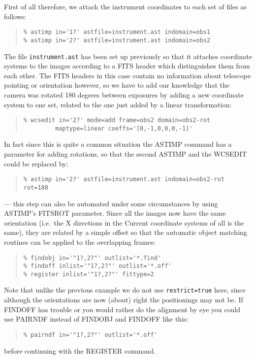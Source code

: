\documentclass[twoside,11pt]{article}
\newcommand{\htmlref}[2]{#1}
\newcommand{\latexhtml}[2]{#1}
\renewcommand{\_}{\texttt{\symbol{95}}}
\newcommand{\ttsize}{\latexhtml{\small}{}}
\newenvironment{myquote}{\begin{quote}\ttsize}{\end{quote}}
\newcommand{\text}[1]{{\ttsize \tt #1}}
\newcommand{\routine}[1]{{\sc #1}}
\newcommand{\xroutine}[1]{\htmlref{{\sc #1}}{#1}}
\begin{document}
First of all therefore, we attach the instrument coordinates
to each set of files as follows:
\begin{myquote}
\begin{verbatim}
% astimp in='1?' astfile=instrument.ast indomain=obs1 
% astimp in='2?' astfile=instrument.ast indomain=obs2
\end{verbatim}
\end{myquote}
The file \text{instrument.ast} has been set up previously so that
it attaches coordinate systems to the images according to 
a FITS header which distinguishes them from each other.
The FITS headers in this case contain no information about 
telescope pointing or orientation however, so we have to add
our knowledge that the camera was rotated 180 degrees between
exposures by adding a new coordinate system to one set, 
related to the one just added by a linear transformation:
\begin{myquote}
\begin{verbatim}
% wcsedit in='2?' mode=add frame=obs2 domain=obs2-rot 
         maptype=linear coeffs='[0,-1,0,0,0,-1]'
\end{verbatim}
\end{myquote}
In fact since this is quite a common situation the \xroutine{ASTIMP}
command has a parameter for adding rotations, so that the second
ASTIMP and the WCSEDIT could be replaced by:
\begin{myquote}
\begin{verbatim}
% astimp in='2?' astfile=instrument.ast indomain=obs2-rot rot=180
\end{verbatim}
\end{myquote}
--- this step can also be automated under some circumstances by using 
\routine{ASTIMP}'s FITSROT parameter.
Since all the images now have the same orientation 
(i.e.\ the X directions in the Current coordinate systems of all is the same), 
they are related
by a simple offset so that the automatic object matching routines
can be applied to the overlapping frames:
\begin{myquote}
\begin{verbatim}
% findobj in='"1?,2?"' outlist='*.find'
% findoff inlist='"1?,2?"' outlist='*.off'
% register inlist='"1?,2?"' fittype=2
\end{verbatim}
\end{myquote}
Note that unlike the previous example we do not use {\tt restrict=true} here,
since although the orientations are now (about) right 
the positionings may not be.
If \routine{FINDOFF} has trouble or you would rather do the alignment
by eye you could use \xroutine{PAIRNDF} instead of 
\routine{FINDOBJ} and \routine{FINDOFF} like this:
\begin{myquote}
\begin{verbatim}
% pairndf in='"1?,2?"' outlist='*.off'
\end{verbatim}
\end{myquote}
before continuing with the \routine{REGISTER} command.
\end{document}

